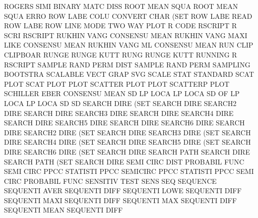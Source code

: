 ROGERS   SIMI                           BINARY   MATC DISS
ROOT     MEAN SQUA                      ROOT     MEAN SQUA ERRO
ROW      LABE COLU                      CONVERT  CHAR (SET
ROW      LABE                           READ     ROW  LABE
ROW      LINE MODE                      TWO      WAY  PLOT
R        CODE                           RSCRIPT
R        SCRI                           RSCRIPT
RUKHIN   VANG                           CONSENSU MEAN
RUKHIN   VANG MAXI LIKE                 CONSENSU MEAN
RUKHIN   VANG ML                        CONSENSU MEAN
RUN      CLIP                           CLIPBOAR
RUNGE                                   RUNGE    KUTT
RUNG                                    RUNGE    KUTT
RUNNING  R                              RSCRIPT
SAMPLE   RAND PERM DIST                 SAMPLE   RAND PERM
SAMPLING                                BOOTSTRA
SCALABLE VECT GRAP                      SVG
SCALE    STAT                           STANDARD
SCAT                                    PLOT
SCAT     PLOT                           PLOT
SCATTER  PLOT                           PLOT
SCATTERP                                PLOT
SCHILLER EBER                           CONSENSU MEAN
SD       LP   LOCA                      LP       LOCA
SD       OF   LP   LOCA                 LP       LOCA
SD                                      SD
SEARCH   DIRE (SET                      SEARCH   DIRE
SEARCH2  DIRE                           SEARCH   DIRE
SEARCH3  DIRE                           SEARCH   DIRE
SEARCH4  DIRE                           SEARCH   DIRE
SEARCH5  DIRE                           SEARCH   DIRE
SEARCH6  DIRE                           SEARCH   DIRE
SEARCH2  DIRE (SET                      SEARCH   DIRE
SEARCH3  DIRE (SET                      SEARCH   DIRE
SEARCH4  DIRE (SET                      SEARCH   DIRE
SEARCH5  DIRE (SET                      SEARCH   DIRE
SEARCH6  DIRE (SET                      SEARCH   DIRE
SEARCH   PATH                           SEARCH   DIRE
SEARCH   PATH (SET                      SEARCH   DIRE
SEMI     CIRC DIST                      PROBABIL FUNC
SEMI     CIRC PPCC                      STATISTI PPCC
SEMICIRC PPCC                           STATISTI PPCC
SEMI     CIRC                           PROBABIL FUNC
SENSITIV                                TEST     SENS
SEQ                                     SEQUENCE
SEQUENTI AVER                           SEQUENTI DIFF
SEQUENTI LOWE                           SEQUENTI DIFF
SEQUENTI MAXI                           SEQUENTI DIFF
SEQUENTI MAX                            SEQUENTI DIFF
SEQUENTI MEAN                           SEQUENTI DIFF
